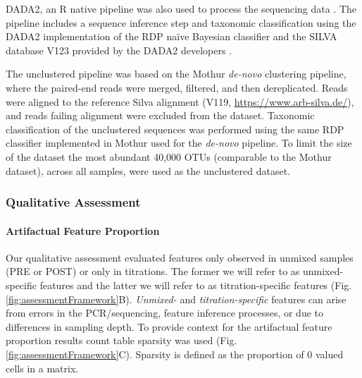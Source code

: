 \documentclass{bmcart}
\begin{document}
DADA2, an R native pipeline was also used to process the sequencing data
\cite{callahan2016dada2}. The pipeline includes a sequence inference
step and taxonomic classification using the DADA2 implementation of the
RDP naïve Bayesian classifier \cite{wang2007naive} and the SILVA
database V123 provided by the DADA2 developers
\cite[\url{https://benjjneb.github.io/dada2/training.html}]{quast2012silva}.

The unclustered pipeline was based on the Mothur \emph{de-novo}
clustering pipeline, where the paired-end reads were merged, filtered,
and then dereplicated. Reads were aligned to the reference Silva
alignment (V119, \url{https://www.arb-silva.de/}), and reads failing
alignment were excluded from the dataset. Taxonomic classification of
the unclustered sequences was performed using the same RDP classifier
implemented in Mothur used for the \emph{de-novo} pipeline. To limit the
size of the dataset the most abundant 40,000 OTUs (comparable to the
Mothur dataset), across all samples, were used as the unclustered
dataset.


\subsubsection*{Qualitative Assessment}
\paragraph*{Artifactual Feature Proportion}
Our qualitative assessment evaluated features only observed in unmixed samples (PRE or POST) or only in titrations.
The former we will refer to as unmixed-specific features and the latter we will refer to as titration-specific features (Fig. \ref{fig:assessmentFramework}B).
\emph{Unmixed-} and \emph{titration-specific} features can arise from errors in the PCR/sequencing, feature inference processes, or due to differences in sampling depth. 
To provide context for the artifactual feature proportion results count table sparsity was used (Fig. \ref{fig:assessmentFramework}C).
Sparsity is defined as the proportion of 0 valued cells in a matrix.
\end{document}
